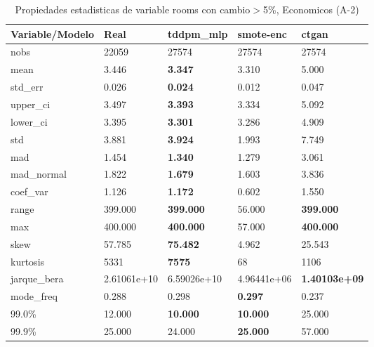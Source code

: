 \begin{table}[H]
\centering
\fontsize{8}{14}\selectfont
\caption{Propiedades estadisticas de variable rooms con cambio\ensuremath{>}5\%, Economicos (A-2)}
\label{table-stats-economicos-a-2-rooms-short}
\begin{tabular}{|l|m{10em}|m{10em}|m{10em}|m{10em}|}
\hline
 \rowcolor[gray]{0.8}
Variable/Modelo & Real & tddpm\_mlp & smote-enc & ctgan \\
\hline nobs & 22059 & 27574 & 27574 & 27574 \\
\hline mean & 3.446 & \bfseries 3.347 & 3.310 & \cellcolor[rgb]{0.9, 0.54, 0.52} 5.000 \\
\hline std\_err & 0.026 & \bfseries 0.024 & 0.012 & \cellcolor[rgb]{0.9, 0.54, 0.52} 0.047 \\
\hline upper\_ci & 3.497 & \bfseries 3.393 & 3.334 & \cellcolor[rgb]{0.9, 0.54, 0.52} 5.092 \\
\hline lower\_ci & 3.395 & \bfseries 3.301 & 3.286 & \cellcolor[rgb]{0.9, 0.54, 0.52} 4.909 \\
\hline std & 3.881 & \bfseries 3.924 & 1.993 & \cellcolor[rgb]{0.9, 0.54, 0.52} 7.749 \\
\hline mad & 1.454 & \bfseries 1.340 & 1.279 & \cellcolor[rgb]{0.9, 0.54, 0.52} 3.061 \\
\hline mad\_normal & 1.822 & \bfseries 1.679 & 1.603 & \cellcolor[rgb]{0.9, 0.54, 0.52} 3.836 \\
\hline coef\_var & 1.126 & \bfseries 1.172 & \cellcolor[rgb]{0.9, 0.54, 0.52} 0.602 & 1.550 \\
\hline range & 399.000 & \bfseries 399.000 & \cellcolor[rgb]{0.9, 0.54, 0.52} 56.000 & \bfseries 399.000 \\
\hline max & 400.000 & \bfseries 400.000 & \cellcolor[rgb]{0.9, 0.54, 0.52} 57.000 & \bfseries 400.000 \\
\hline skew & 57.785 & \bfseries 75.482 & \cellcolor[rgb]{0.9, 0.54, 0.52} 4.962 & 25.543 \\
\hline kurtosis & 5331 & \bfseries 7575 & \cellcolor[rgb]{0.9, 0.54, 0.52} 68 & 1106 \\
\hline jarque\_bera & 2.61061e+10 & \cellcolor[rgb]{0.9, 0.54, 0.52} 6.59026e+10 & 4.96441e+06 & \bfseries 1.40103e+09 \\
\hline mode\_freq & 0.288 & 0.298 & \bfseries 0.297 & \cellcolor[rgb]{0.9, 0.54, 0.52} 0.237 \\
\hline 99.0\% & 12.000 & \bfseries 10.000 & \bfseries 10.000 & \cellcolor[rgb]{0.9, 0.54, 0.52} 25.000 \\
\hline 99.9\% & 25.000 & 24.000 & \bfseries 25.000 & \cellcolor[rgb]{0.9, 0.54, 0.52} 57.000 \\
\hline
\end{tabular}
\end{table}
